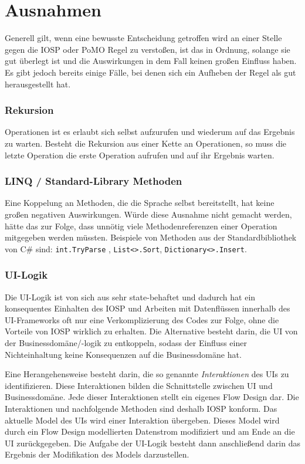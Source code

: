 \section{Ausnahmen}

Generell gilt, wenn eine bewusste Entscheidung getroffen wird an einer Stelle gegen die IOSP oder PoMO Regel zu verstoßen, ist das in Ordnung, solange sie gut überlegt ist und
die Auswirkungen in dem Fall keinen großen Einfluss haben.
Es gibt jedoch bereits einige Fälle, bei denen sich ein Aufheben der Regel als gut
herausgestellt hat.
\subsubsection{Rekursion}

Operationen ist es erlaubt sich selbst aufzurufen und wiederum auf das Ergebnis
zu warten. Besteht die Rekursion aus einer Kette an Operationen, so muss die letzte
Operation die erste Operation aufrufen und auf ihr Ergebnis warten.
\subsubsection{LINQ / Standard-Library Methoden}

Eine Koppelung an Methoden, die die Sprache selbst bereitstellt, hat keine
großen negativen Auswirkungen. Würde diese Ausnahme nicht gemacht werden, hätte
das zur Folge, dass unnötig viele Methodenreferenzen einer Operation mitgegeben werden
müssten. Beispiele von Methoden aus der Standardbibliothek von C\# sind:
\texttt{int.TryParse} , \texttt{List<>.Sort}, \texttt{Dictionary<>.Insert}.

\subsubsection{UI-Logik}

Die UI-Logik ist von sich aus sehr state-behaftet und dadurch hat ein
konsequentes Einhalten des IOSP und Arbeiten mit Datenflüssen innerhalb des UI-Frameworks oft nur eine
Verkomplizierung des Codes zur Folge, ohne die Vorteile von IOSP wirklich zu
erhalten. Die Alternative besteht darin, die UI von der Businessdomäne/-logik zu
entkoppeln, sodass der Einfluss einer Nichteinhaltung keine Konsequenzen auf
die Businessdomäne hat.

Eine Herangehensweise besteht darin, die so genannte \emph{Interaktionen} des
UIs zu identifizieren. Diese Interaktionen bilden  die Schnittstelle
zwischen UI und Businessdomäne. Jede dieser Interaktionen stellt ein eigenes
Flow Design dar. Die Interaktionen und nachfolgende Methoden sind deshalb IOSP
konform. Das aktuelle Model des UIs wird einer Interaktion übergeben.
Dieses Model wird durch ein Flow Design modellierten Datenstrom modifiziert und am
Ende an die UI zurückgegeben. 
Die Aufgabe der UI-Logik besteht dann anschließend darin das Ergebnis der Modifikation des Models darzustellen.






